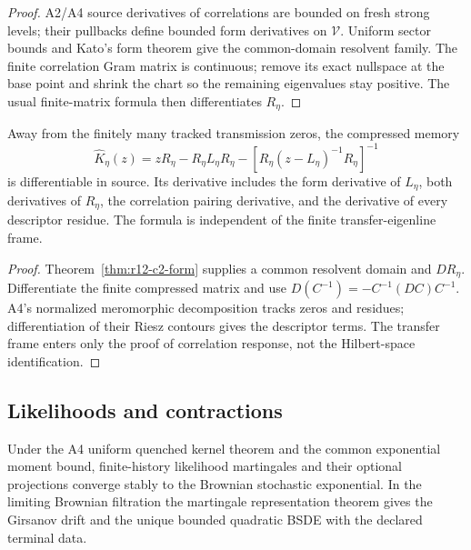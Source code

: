 \begin{proof}
A2/A4 source derivatives of correlations are bounded on fresh strong levels;
their pullbacks define bounded form derivatives on $\mathcal V$.  Uniform
sector bounds and Kato's form theorem give the common-domain resolvent family.
The finite correlation Gram matrix is continuous; remove its exact nullspace
at the base point and shrink the chart so the remaining eigenvalues stay
positive.  The usual finite-matrix formula then differentiates $R_\eta$.
\end{proof}

\begin{theorem}
\label{thm:r12-c2-memory}
Away from the finitely many tracked transmission zeros, the compressed memory
\[
 \widehat K_\eta(z)=zR_\eta-R_\eta L_\eta R_\eta-
 [R_\eta(z-L_\eta)^{-1}R_\eta]^{-1}
\]
is differentiable in source.  Its derivative includes the form derivative of
$L_\eta$, both derivatives of $R_\eta$, the correlation pairing derivative,
and the derivative of every descriptor residue.  The formula is independent
of the finite transfer-eigenline frame.
\end{theorem}

\begin{proof}
Theorem~\ref{thm:r12-c2-form} supplies a common resolvent domain and
$DR_\eta$.  Differentiate the finite compressed matrix and use
$D(C^{-1})=-C^{-1}(DC)C^{-1}$.  A4's normalized meromorphic decomposition
tracks zeros and residues; differentiation of their Riesz contours gives the
descriptor terms.  The transfer frame enters only the proof of correlation
response, not the Hilbert-space identification.
\end{proof}

\subsection{Likelihoods and contractions}

\begin{theorem}
\label{thm:r12-c2-optional}
Under the A4 uniform quenched kernel theorem and the common exponential moment
bound, finite-history likelihood martingales and their optional projections
converge stably to the Brownian stochastic exponential.  In the limiting
Brownian filtration the martingale representation theorem gives the Girsanov
drift and the unique bounded quadratic BSDE with the declared terminal data.
\end{theorem}

